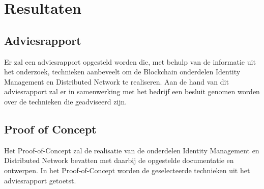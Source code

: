 \chapter{Resultaten}

\section{Adviesrapport}

Er zal een adviesrapport opgesteld worden die, met behulp van de informatie uit het onderzoek, technieken aanbeveelt om de Blockchain onderdelen Identity Management en Distributed Network te realiseren. Aan de hand van dit adviesrapport zal er in samenwerking met het bedrijf een besluit genomen worden over de technieken die geadviseerd zijn.

\section{Proof of Concept}

Het Proof-of-Concept zal de realisatie van de onderdelen Identity Management en Distributed Network bevatten met daarbij de opgestelde documentatie en ontwerpen. In het Proof-of-Concept worden de geselecteerde technieken uit het adviesrapport getoetst.


